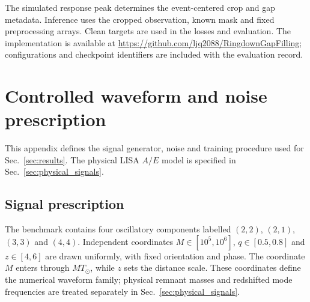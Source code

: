 \documentclass[10pt,prd,aps,a4paper,twocolumn,superscriptaddress,nofootinbib,floatfix]{revtex4-2}
\begin{document}
The simulated response peak determines the event-centered crop and gap metadata. Inference uses the cropped observation, known mask and fixed preprocessing arrays. Clean targets are used in the losses and evaluation. The implementation is available at \url{https://github.com/ljq2088/RingdownGapFilling}; configurations and checkpoint identifiers are included with the evaluation record.

\section{Controlled waveform and noise prescription}\label{app:sequence_modeling}
This appendix defines the signal generator, noise and training procedure used for Sec.~\ref{sec:results}. The physical LISA $A/E$ model is specified in Sec.~\ref{sec:physical_signals}.
\subsection{Signal prescription}
The benchmark contains four oscillatory components labelled $(2,2)$, $(2,1)$, $(3,3)$ and $(4,4)$. Independent coordinates $M\in[10^5,10^6]$, $q\in[0.5,0.8]$ and $z\in[4,6]$ are drawn uniformly, with fixed orientation and phase. The coordinate $M$ enters through $MT_\odot$, while $z$ sets the distance scale. These coordinates define the numerical waveform family; physical remnant masses and redshifted mode frequencies are treated separately in Sec.~\ref{sec:physical_signals}.
\end{document}
